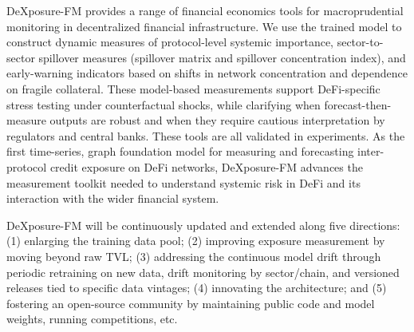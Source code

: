DeXposure-FM provides a range of financial economics tools for macroprudential monitoring in decentralized financial infrastructure. We use the trained model to construct dynamic measures of protocol-level systemic importance, sector-to-sector spillover measures (spillover matrix and spillover concentration index), and early-warning indicators based on shifts in network concentration and dependence on fragile collateral. These model-based measurements support DeFi-specific stress testing under counterfactual shocks, while clarifying when forecast-then-measure outputs are robust and when they require cautious interpretation by regulators and central banks. These tools are all validated in experiments.
As the first time-series, graph foundation model for measuring and forecasting inter-protocol credit exposure on DeFi networks, DeXposure-FM advances the measurement toolkit needed to understand systemic risk in DeFi and its interaction with the wider financial system.

DeXposure-FM will be continuously updated and extended along five directions: (1) enlarging the training data pool; (2) improving exposure measurement by moving beyond raw TVL; (3) addressing the continuous model drift through periodic retraining on new data, drift monitoring by sector/chain, and versioned releases tied to specific data vintages; (4) innovating the architecture; and (5) fostering an open-source community by maintaining public code and model weights, running competitions, etc.
